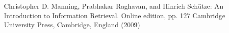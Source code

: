 \documentclass[runningheads]{llncs}
\begin{document}
\begin{thebibliography}{8}





Christopher D. Manning, Prabhakar Raghavan, and Hinrich Schütze:
An Introduction to Information Retrieval. Online edition, pp. 127 Cambridge University Press,
Cambridge, England (2009)

\end{thebibliography}
\end{document}
